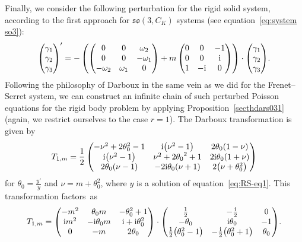 \documentclass[pdftex]{sigma}%
\numberwithin{equation}{section}
\begin{document}
Finally, we consider the following perturbation for the rigid solid system, according to the first approach for $\mathfrak{so}(3, C_K)$ systems (see
	equation~\eqref{eq:system so3}):
\begin{gather*}
\begin{pmatrix} \gamma_1 \\ \gamma_2 \\ \gamma_3 \end{pmatrix}' = - \left (\begin{pmatrix}
0 & 0 & \omega_2 \\ 0 & 0 & - \omega_1 \\ -\omega_2 & \omega_1 & 0 \end{pmatrix} + m \begin{pmatrix} 0 & 0 & -1 \\ 0 & 0 & {\rm i} \\ 1 & -{\rm i} & 0 \end{pmatrix} \right ) \cdot
\begin{pmatrix} \gamma_1 \\ \gamma_2 \\ \gamma_3 \end{pmatrix}\! .
\end{gather*}
Following the philosophy of Darboux in the same vein as we did for the Frenet--Serret system, we can construct an infinite chain of such perturbed Poisson equations for the rigid body problem by applying Proposition~\ref{secthdars031} (again, we restrict ourselves to the case $r=1$). The Darboux transformation is given by
\begin{gather*}
T_{1,m} = \frac{1}{2} \begin{pmatrix}
-{\nu}^{2} + 2 \theta_0 ^{2} -1 & {\rm i} \big({\nu}^{2} -1\big) & 2\theta_0 (1 - \nu) \\
 {\rm i} \big({\nu}^{2} -1\big) &{\nu}^{2}+ 2{\theta_0 }^{2}+1 & 2 {\rm i} \theta_0 (1 +\nu) \\
 2 \theta_0 (\nu -1) &-2 {\rm i} \theta_0 (\nu +1) & 2 \big(\nu + \theta_0 ^2\big)
 \end{pmatrix}
\end{gather*}
for $\theta_0 = \frac{y'}{y}$ and $\nu=m + \theta_0 ^2$, where $y$ is a solution of equation~\eqref{eq:RS-eq1}.
This transformation factors~as
\begin{gather*}
T_{1,m} = \begin{pmatrix}
-m^2 & \theta_0 m & - \theta_0^2 +1 \\ {\rm i}m^2 & -{\rm i} \theta_0 m & {\rm i} + {\rm i} \theta_0^2 \\ 0 & -m & 2\theta_0 \end{pmatrix} \cdot \begin{pmatrix} \frac{1}{2} & - \frac{\rm i}{2} & 0 \\ -\theta_0 & {\rm i} \theta_0 & -1 \\ \frac{1}{2} \big(\theta_0^2 -1\big) & - \frac{\rm i}{2} \big(\theta_0^2 +1\big) & \theta_0
\end{pmatrix}\!.
\end{gather*}
\end{document}
